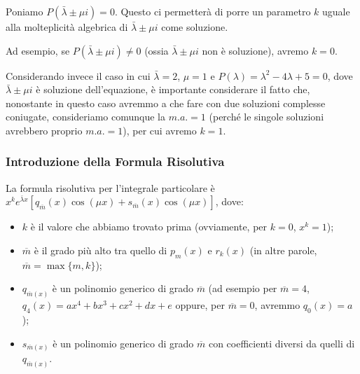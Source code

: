\documentclass[a4paper,11pt]{article}
\begin{document}
\noindent Poniamo $P(\bar{\lambda}\pm\mu i)=0$. Questo ci permetterà di porre un parametro $k$ uguale alla molteplicità algebrica di $\bar{\lambda}\pm\mu i$ come soluzione.

\noindent Ad esempio, se $P(\bar{\lambda}\pm\mu i)\neq0$ (ossia $\bar{\lambda}\pm\mu i$ non è soluzione), avremo $k=0$.

\noindent Considerando invece il caso in cui $\bar{\lambda}=2$, $\mu=1$ e $P(\lambda)=\lambda^2-4\lambda+5=0$, dove $\bar{\lambda}\pm\mu i$ è soluzione dell'equazione, è importante considerare il fatto che, nonostante in questo caso avremmo a che fare con due soluzioni complesse coniugate, consideriamo comunque la $m.a.=1$ (perché le singole soluzioni avrebbero proprio $m.a.=1$), per cui avremo $k=1$.

\subsubsection[Formula Risolutiva]{Introduzione della Formula Risolutiva}
La formula risolutiva per l'integrale particolare è $x^ke^{\bar{\lambda} x}[q_{\overline{m}}(x)\cos{(\mu x)}+s_{\overline{m}}(x)\cos{(\mu x)}]$, dove:
\begin{itemize}
    \item$k$ è il valore che abbiamo trovato prima (ovviamente, per $k=0$, $x^k=1$);
    \item$\overline{m}$ è il grado più alto tra quello di $p_m(x)$ e $r_k(x)$ (in altre parole, $\overline{m}=\max{\{m,k\}}$);
	\item $q_{\overline{m}(x)}$ è un polinomio generico di grado $\overline{m}$ (ad esempio per $\overline{m}=4$, $q_4(x)=ax^4+bx^3+cx^2+dx+e$ oppure, per $\overline{m}=0$, avremmo $q_0(x)=a$);
	\item $s_{\overline{m}(x)}$ è un polinomio generico di grado $\overline{m}$ con coefficienti diversi da quelli di $q_{\overline{m}(x)}$.
\end{itemize}
\end{document}
